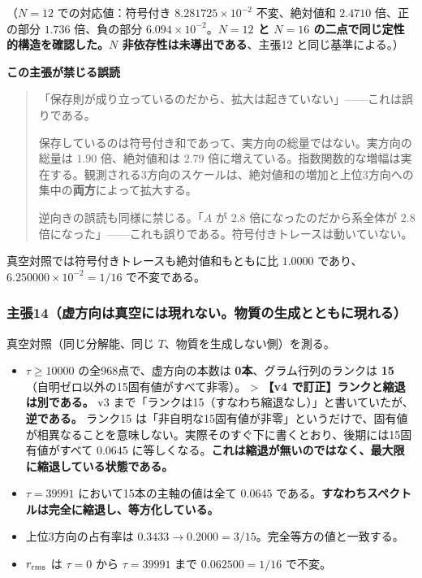 \documentclass[
  10pt,
]{ltjsarticle}
\providecommand{\tightlist}{%
  \setlength{\itemsep}{0pt}\setlength{\parskip}{0pt}}
\begin{document}
（\(N=12\) での対応値：符号付き \(8.281725\times10^{-2}\) 不変、絶対値和
\(2.4710\) 倍、正の部分 \(1.736\) 倍、負の部分
\(6.094\times10^{-2}\)。\textbf{\(N=12\) と \(N=16\)
の二点で同じ定性的構造を確認した。\(N\) 非依存性は未導出である}、主張12
と同じ基準による。）

\textbf{この主張が禁じる誤読}

\begin{quote}
「保存則が成り立っているのだから、拡大は起きていない」------これは誤りである。

保存しているのは符号付き和であって、実方向の総量ではない。実方向の総量は
\(1.90\) 倍、絶対値和は \(2.79\)
倍に増えている。指数関数的な増幅は実在する。観測される3方向のスケールは、絶対値和の増加と上位3方向への集中の\textbf{両方}によって拡大する。

逆向きの誤読も同様に禁じる。「\(A\) が \(2.8\)
倍になったのだから系全体が \(2.8\)
倍になった」------これも誤りである。符号付きトレースは動いていない。
\end{quote}

真空対照では符号付きトレースも絶対値和もともに比 \(1.0000\)
であり、\(6.250000\times10^{-2} = 1/16\) で不変である。

\subsubsection{主張14（虚方向は真空には現れない。物質の生成とともに現れる）}\label{ux4e3bux5f3514ux865aux65b9ux5411ux306fux771fux7a7aux306bux306fux73feux308cux306aux3044ux7269ux8ceaux306eux751fux6210ux3068ux3068ux3082ux306bux73feux308cux308b}

真空対照（同じ分解能、同じ \(T\)、物質を生成しない側）を測る。

\begin{itemize}
\tightlist
\item
  \(\tau \ge 10000\) の全968点で、虚方向の本数は
  \textbf{0本}、グラム行列のランクは
  \textbf{15}（自明ゼロ以外の15固有値がすべて非零）。 \textgreater{}
  \textbf{【v4 で訂正】ランクと縮退は別である。} v3
  まで「ランクは15（すなわち縮退なし）」と書いていたが、\textbf{逆である。}
  ランク15
  は「非自明な15固有値が非零」というだけで、固有値が相異なることを意味しない。実際そのすぐ下に書くとおり、後期には15固有値がすべて
  \(0.0645\)
  に等しくなる。\textbf{これは縮退が無いのではなく、最大限に縮退している状態である。}
\item
  \(\tau = 39991\) において15本の主軸の値は全て \(0.0645\)
  である。\textbf{すなわちスペクトルは完全に縮退し、等方化している。}
\item
  上位3方向の占有率は
  \(0.3433 \to 0.2000 = 3/15\)。完全等方の値と一致する。
\item
  \(r_{\rm rms}\) は \(\tau = 0\) から \(\tau = 39991\) まで
  \(0.062500 = 1/16\) で不変。
\end{itemize}
\end{document}
